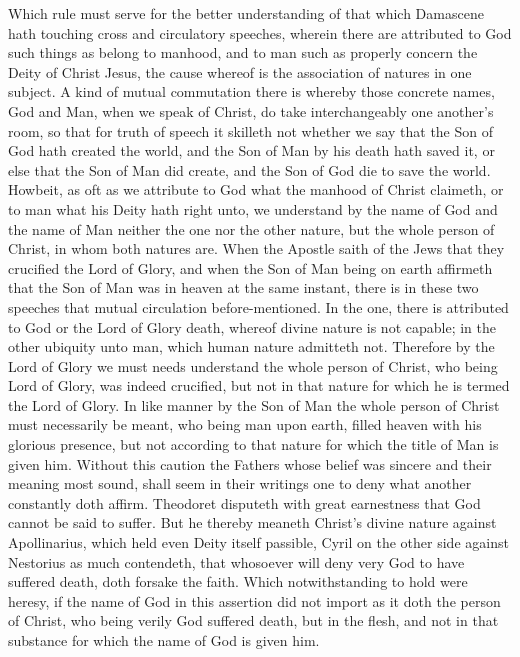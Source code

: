 Which rule must serve for the better understanding of that which Damascene hath touching cross and circulatory speeches, wherein there are attributed to God such things as belong to manhood, and to man such as properly concern the Deity of Christ Jesus, the cause whereof is the association of natures in one subject. A kind of mutual commutation there is whereby those concrete names, God and Man, when we speak of Christ, do take interchangeably one another’s room, so that for truth of speech it skilleth not whether we say that the Son of God hath created the world, and the Son of Man by his death hath saved it, or else that the Son of Man did create, and the Son of God die to save the world. Howbeit, as oft as we attribute to God what the manhood of Christ claimeth, or to man what his Deity hath right unto, we understand by the name of God and the name of Man neither the one nor the other nature, but the whole person of Christ, in whom both natures are. When the Apostle saith of the Jews that they crucified the Lord of Glory, and when the Son of Man being on earth affirmeth that the Son of Man was in heaven at the same instant, there is in these two speeches that mutual circulation before-mentioned. In the one, there is attributed to God or the Lord of Glory death, whereof divine nature is not capable; in the other ubiquity unto man, which human nature admitteth not. Therefore by the Lord of Glory we must needs understand the  whole person of Christ, who being Lord of Glory, was indeed crucified, but not in that nature for which he is termed the Lord of Glory. In like manner by the Son of Man the whole person of Christ must necessarily be meant, who being man upon earth, filled heaven with his glorious presence, but not according to that nature for which the title of Man is given him.
Without this caution the Fathers whose belief was sincere and their meaning most sound, shall seem in their writings one to deny what another constantly doth affirm. Theodoret disputeth with great earnestness that God cannot be said to suffer. But he thereby meaneth Christ’s divine nature against Apollinarius, which held even Deity itself passible, Cyril on the other side against Nestorius as much contendeth, that whosoever will deny very God to have suffered death, doth forsake the faith. Which notwithstanding to hold were heresy, if the name of God in this assertion did not import as it doth the person of Christ, who being verily God suffered death, but in the flesh, and not in that substance for which the name of God is given him.

